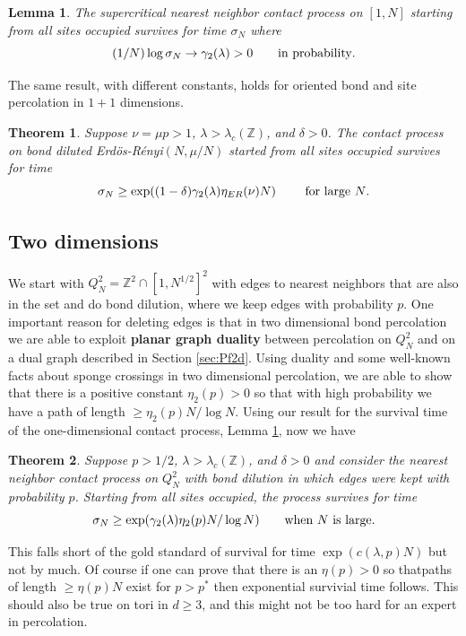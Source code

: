 \documentclass[11pt]{article}
\newtheorem{theorem}{Theorem}
\newtheorem{lemma}{Lemma}[section]
\theoremstyle{definition}
\def\beq{ \begin{equation} }
\def\eeq{ \end{equation} }
\def\ZZ{\mathbb{Z}}
\def\ERns{Erd\"os-R\'enyi}
\begin{document}
\begin{lemma} \label{d1surv}
The supercritical nearest neighbor contact process on $[1,N]$ starting from all sites occupied survives for time $\sigma_N$ where 
\beq
(1/N) \log \sigma_N\to \gamma_2(\lambda)>0  \qquad\hbox{in probability}.
\label{rstime}
\eeq
\end{lemma}

\noindent
The same result, with different constants, holds for oriented bond and site percolation in $1+1$ dimensions.

\begin{theorem} \label{lbsurvER}
Suppose $\nu = \mu p>1$, $\lambda > \lambda_c(\ZZ)$, and $\delta>0$. The  contact process on bond diluted \ERns$(N,\mu/N)$ started from all sites occupied survives for time 
$$
\sigma_N\ge \exp((1-\delta)\gamma_2(\lambda) \eta_{ER}(\nu) N)
\qquad\hbox{ for large $N$}.
$$ 
\end{theorem}

\subsection{Two dimensions}

We start with $Q^2_N =\ZZ^2 \cap [1,N^{1/2}]^2$ with edges to nearest neighbors that are also in the set and do bond dilution, where we keep edges with probability $p$. One important reason for deleting edges is that in two dimensional bond percolation we are able to exploit {\bf planar graph duality} between percolation on $Q^2_N$ and on a dual graph described in Section \ref{sec:Pf2d}. Using duality and some well-known facts about sponge crossings in two dimensional percolation, we are able to show that there is a positive constant $\eta_2(p)>0$ so that with high probability we have a path of length $\ge \eta_2 (p)N/\log N$. Using our result for the survival time of the one-dimensional contact process, Lemma \ref{d1surv}, now we have


\begin{theorem} \label{dens2D}
Suppose $p>1/2$, $\lambda > \lambda_c(\ZZ)$, and $\delta>0$ and consider the nearest neighbor contact process on $Q^2_N$ with bond dilution in which edges were kept with probability $p$. Starting from all sites occupied, the process survives for time
$$
\sigma_N \ge \exp(\gamma_2(\lambda)\eta_2(p) N/\log N)
\qquad\hbox{when $N$ is large.}
$$ 
\end{theorem}

\noindent
This falls short of the gold standard of survival for time $\exp(c(\lambda,p)N)$ but not by much. Of course if one can prove that there is an $\eta(p)>0$ so thatpaths of length $\ge \eta(p)N$ exist for $p>p^*$ then exponential survivial time follows. This should also be true on tori in $d\ge 3$, and this might not be too hard for an expert in percolation.
\end{document}

